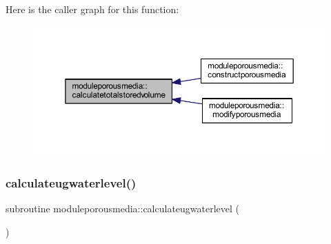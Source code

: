 Here is the caller graph for this function\+:\nopagebreak
\begin{figure}[H]
\begin{center}
\leavevmode
\includegraphics[width=350pt]{namespacemoduleporousmedia_a445b7f7d63644c6c7b90d76b56175868_icgraph}
\end{center}
\end{figure}
\mbox{\label{namespacemoduleporousmedia_a3ba8c32bae3dfce05b772d49374e1381}} 
\subsubsection{\texorpdfstring{calculateugwaterlevel()}{calculateugwaterlevel()}}
{\footnotesize\ttfamily subroutine moduleporousmedia\+::calculateugwaterlevel (\begin{DoxyParamCaption}{ }\end{DoxyParamCaption})\hspace{0.3cm}{\ttfamily [private]}}

